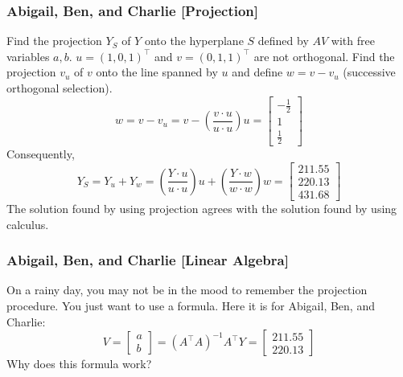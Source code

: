 \documentclass[xcolor=dvipsnames]{beamer}
\begin{document}
\begin{frame}
  \frametitle{Abigail, Ben, and Charlie [Projection]}
  Find the projection $Y_{S}$ of $Y$ onto the hyperplane $S$ defined
  by $AV$ with free variables $a,b$. $u=(1,0,1)^{\intercal}$ and
  $v=(0,1,1)^{\intercal}$ are not orthogonal. Find the projection
  $v_{u}$ of $v$ onto the line spanned by $u$ and define $w=v-v_{u}$
  (successive orthogonal selection).
  \begin{equation}
    \label{eq:ierishie}
    w=v-v_{u}=v-\left(\frac{v\cdot{}u}{u\cdot{}u}\right)u=\left[
      \begin{array}{c}
        -\frac{1}{2} \\
        1 \\
        \frac{1}{2}
      \end{array}\right]
  \end{equation}
  Consequently,
  \begin{equation}
    \label{eq:dieshahz}
    Y_{S}=Y_{u}+Y_{w}=\left(\frac{Y\cdot{}u}{u\cdot{}u}\right)u+\left(\frac{Y\cdot{}w}{w\cdot{}w}\right)w=\left[
      \begin{array}{c}
        211.55 \\
        220.13 \\
        431.68
      \end{array}\right]
  \end{equation}
The solution found by using projection agrees with the solution found by using calculus.
\end{frame}

\begin{frame}
  \frametitle{Abigail, Ben, and Charlie [Linear Algebra]}
  On a rainy day, you may not be in the mood to remember the
  projection procedure. You just want to use a formula. Here it is for
  Abigail, Ben, and Charlie:
  \begin{equation}
    \label{eq:zeifaidu}
    V=\left[
      \begin{array}{c}
        a \\
        b
      \end{array}\right]=(A^{\intercal}A)^{-1}A^{\intercal}Y=\left[
      \begin{array}{c}
        211.55 \\
        220.13
      \end{array}\right]
  \end{equation}
Why does this formula work?
\end{frame}
\end{document}
